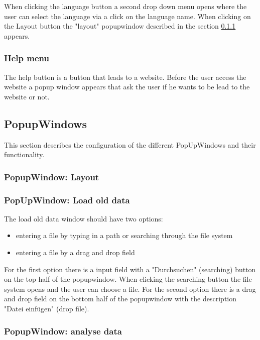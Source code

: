 \documentclass{scrreprt}
\begin{document}
When clicking the language button a second drop down menu opens where the user can select the language via a click on the language name. 
When clicking on the Layout button the "layout" popupwindow described in the section \ref{cap: PopupWindow_layout} appears. 

\subsubsection{Help menu}

The help button is a button that leads to a website. Before the user access the website a popup window appears that ask the user if he wants to be lead to the website or not. 


\subsection{PopupWindows}
This section describes the configuration of the different PopUpWindows and their functionality.

\subsubsection{PopupWindow: Layout}\label{cap: PopupWindow_layout}


\subsubsection{PopUpWindow: Load old data}\label{cap: PopupWindow_loadoldata}
The load old data window should have two options: 
\begin{itemize}
    \item entering a file by typing in a path or searching through the file system
    \item entering a file by a drag and drop field 
\end{itemize}
For the first option there is a input field with a "Durchsuchen" (searching) button on the top half of the popupwindow. When clicking the searching button the file system opens and the user can choose a file.
For the second option there is a drag and drop field on the bottom half of the popupwindow with the description "Datei einfügen" (drop file). 


\subsubsection{PopupWindow: analyse data}\label{cap: PopupWindow_analysedata}
\end{document}

